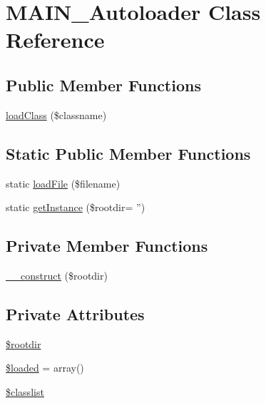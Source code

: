 \hypertarget{classMAIN__Autoloader}{
\section{MAIN\_\-Autoloader Class Reference}
\label{dd/d71/classMAIN__Autoloader}
}
\subsection*{Public Member Functions}
\begin{DoxyCompactItemize}
\item 
\hyperlink{classMAIN__Autoloader_a58a2d3299366e703eebd60192d927ed9}{loadClass} (\$classname)
\end{DoxyCompactItemize}
\subsection*{Static Public Member Functions}
\begin{DoxyCompactItemize}
\item 
static \hyperlink{classMAIN__Autoloader_a458b2d4ca327f7e614a9f99e7df23ba7}{loadFile} (\$filename)
\item 
static \hyperlink{classMAIN__Autoloader_aa3acf8b51f564e1d79d622b6e5fcf1a4}{getInstance} (\$rootdir= '')
\end{DoxyCompactItemize}
\subsection*{Private Member Functions}
\begin{DoxyCompactItemize}
\item 
\hyperlink{classMAIN__Autoloader_a201bd218d1efdce335722cd1e60ef599}{\_\-\_\-construct} (\$rootdir)
\end{DoxyCompactItemize}
\subsection*{Private Attributes}
\begin{DoxyCompactItemize}
\item 
\hyperlink{classMAIN__Autoloader_ab05969a6f2b5904a8de5e2f530441be7}{\$rootdir}
\item 
\hyperlink{classMAIN__Autoloader_a93fa8cea8b9c2e30d179521ab8c3edab}{\$loaded} = array()
\item 
\hyperlink{classMAIN__Autoloader_a1ba4327fb805ecd48589610463c3a8c4}{\$classlist}
\end{DoxyCompactItemize}
